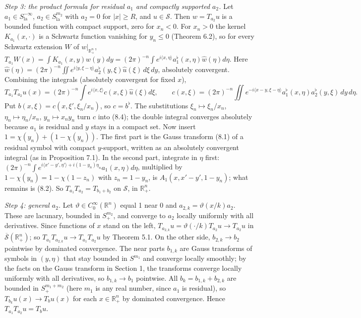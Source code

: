 \documentclass[
  11pt,
]{article}
\begin{document}
\emph{Step 3: the product formula for residual \(a_1\) and compactly
supported \(a_2\).} Let \(a_1\in S^{-\infty}_{\mathrm{la}}\),
\(a_2\in S^{m_2}_{\mathrm{la}}\) with \(a_2=0\) for \(|x|\geq R\), and
\(u\in\mathcal S\). Then \(w=T_{a_2}u\) is a bounded function with
compact support, zero for \(x_n<0\). For \(x_n>0\) the kernel
\(K_{a_1}(x,\cdot)\) is a Schwartz function vanishing for \(y_n\leq0\)
(Theorem 6.2), so for every Schwartz extension \(W\) of
\(w|_{\mathbb R^n_+}\),
\(T_{a_1}W(x)=\int K_{a_1}(x,y)w(y)dy=(2\pi)^{-n}\int e^{i\langle x,\eta\rangle}a_1^\flat(x,\eta)\widehat w(\eta)d\eta\).
Here
\(\widehat w(\eta)=(2\pi)^{-n}\iint e^{i\langle y,\xi-\eta\rangle}a_2^\flat(y,\xi)\widehat u(\xi)\,d\xi\,dy\),
absolutely convergent. Combining the integrals (absolutely convergent
for fixed \(x\)), \[
T_{a_1}T_{a_2}u(x)=(2\pi)^{-n}\int e^{i\langle x,\xi\rangle}c(x,\xi)\widehat u(\xi)d\xi,\qquad c(x,\xi)=(2\pi)^{-n}\iint e^{-i\langle x-y,\xi-\eta\rangle}a_1^\flat(x,\eta)a_2^\flat(y,\xi)\,dy\,d\eta .
\] Put \(b(x,\xi)=c(x,\xi',\xi_n/x_n)\), so \(c=b^\flat\). The
substitutions \(\xi_n\mapsto\xi_n/x_n\), \(\eta_n\mapsto\eta_n/x_n\),
\(y_n\mapsto x_ny_n\) turn \(c\) into (8.4); the double integral
converges absolutely because \(a_1\) is residual and \(y\) stays in a
compact set. Now insert \(1=\chi(y_n)+(1-\chi(y_n))\). The first part is
the Gauss transform (8.1) of a residual symbol with compact
\(y\)-support, written as an absolutely convergent integral (as in
Proposition 7.1). In the second part, integrate in \(\eta\) first:
\((2\pi)^{-n}\int e^{i\langle x'-y',\eta'\rangle+i(1-y_n)\eta_n}a_1(x,\eta)d\eta\),
multiplied by \(1-\chi(y_n)=1-\chi(1-z_n)\) with \(z_n=1-y_n\), is
\(A_1(x,x'-y',1-y_n)\); what remains is (8.2). So
\(T_{a_1}T_{a_2}=T_{b_1+b_2}\) on \(\mathcal S\), in \(\mathbb R^n_+\).

\emph{Step 4: general \(a_2\).} Let
\(\vartheta\in C_0^\infty(\mathbb R^n)\) equal 1 near 0 and
\(a_{2,k}=\vartheta(x/k)a_2\). These are lacunary, bounded in
\(S^{m_2}_+\), and converge to \(a_2\) locally uniformly with all
derivatives. Since functions of \(x\) stand on the left,
\(T_{a_{2,k}}u=\vartheta(\cdot/k)T_{a_2}u\to T_{a_2}u\) in
\(\overline{\mathcal S}(\mathbb R^n_+)\); so
\(T_{a_1}T_{a_{2,k}}u\to T_{a_1}T_{a_2}u\) by Theorem 5.1. On the other
side, \(b_{2,k}\to b_2\) pointwise by dominated convergence. The near
parts \(b_{1,k}\) are Gauss transforms of symbols in \((y,\eta)\) that
stay bounded in \(S^{m_1}\) and converge locally smoothly; by the facts
on the Gauss transform in Section 1, the transforms converge locally
uniformly with all derivatives, so \(b_{1,k}\to b_1\) pointwise. All
\(b_k=b_{1,k}+b_{2,k}\) are bounded in \(S^{m_1+m_2}_+\) (here \(m_1\)
is any real number, since \(a_1\) is residual), so
\(T_{b_k}u(x)\to T_bu(x)\) for each \(x\in\mathbb R^n_+\) by dominated
convergence. Hence \(T_{a_1}T_{a_2}u=T_bu\).
\end{document}
